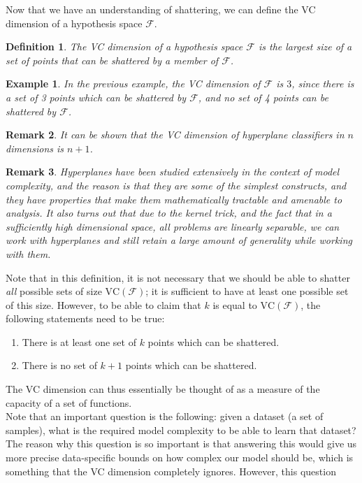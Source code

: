 \documentclass[11pt]{article}
\newcommand{\nl}{\vspace*{0.3cm}\\}
\newtheorem{example}[theorem]{Example}
\newtheorem{definition}{Definition}[section]
\newtheorem{remark}[definition]{Remark}
\begin{document}
Now that we have an understanding of shattering, we can define the VC dimension of a  hypothesis space $\mathcal{F}$.
\begin{definition}
    The \emph{VC dimension} of a hypothesis space $\mathcal{F}$ is the largest size of a set of points that can be shattered by a member of $\mathcal{F}$.
\end{definition}
\begin{example}
    In the previous example, the VC dimension of $\mathcal{F}$ is $3$, since there is a set of 3 points which can be shattered by $\mathcal{F}$, and no set of 4 points can be shattered by
    $\mathcal{F}$.
\end{example}
\begin{remark}
    It can be shown that the VC dimension of hyperplane classifiers in $n$ dimensions is $n + 1$.
\end{remark}
\begin{remark}
    Hyperplanes have been studied extensively in the context of model complexity, and the reason is that they are some of the simplest constructs, and they have properties that make them
    mathematically tractable and amenable to analysis. It also turns out that due to the kernel trick, and the fact that in a sufficiently high dimensional space, all problems are linearly separable,
    we can work with hyperplanes and still retain a large amount of generality while working with them.
\end{remark}
Note that in this definition, it is not necessary that we should be able to shatter \emph{all} possible sets of size $\text{VC}(\mathcal{F})$; it is sufficient to have at least one possible set of
this size. However, to be able to claim that $k$ is equal to $\text{VC}(\mathcal{F})$, the following statements need to be true:
\begin{enumerate}
    \item There is at least one set of $k$ points which can be shattered.
    \item There is no set of $k + 1$ points which can be shattered.
\end{enumerate}
The VC dimension can thus essentially be thought of as a measure of the capacity of a set of functions.\nl
Note that an important question is the following: given a dataset (a set of samples), what is the required model complexity to be able to learn that dataset? The reason why this question is so
important is that answering this would give us more precise data-specific bounds on how complex our model should be, which is something that the VC dimension completely ignores. However, this question
\end{document}
